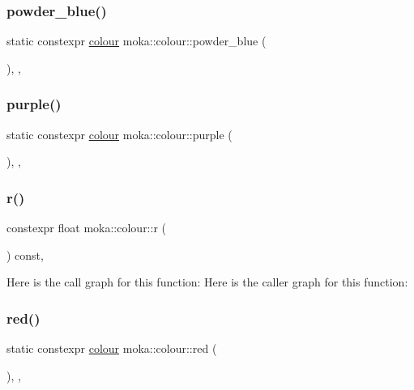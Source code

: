 \subsubsection{\texorpdfstring{powder\_blue()}{powder\_blue()}}
{\footnotesize\ttfamily static constexpr \mbox{\hyperlink{classmoka_1_1colour}{colour}} moka\+::colour\+::powder\+\_\+blue (\begin{DoxyParamCaption}{ }\end{DoxyParamCaption})\hspace{0.3cm}{\ttfamily [inline]}, {\ttfamily [static]}, {\ttfamily [noexcept]}}

\mbox{\label{classmoka_1_1colour_af0e9e47e97a2b81d006c11077715786b}} 
\subsubsection{\texorpdfstring{purple()}{purple()}}
{\footnotesize\ttfamily static constexpr \mbox{\hyperlink{classmoka_1_1colour}{colour}} moka\+::colour\+::purple (\begin{DoxyParamCaption}{ }\end{DoxyParamCaption})\hspace{0.3cm}{\ttfamily [inline]}, {\ttfamily [static]}, {\ttfamily [noexcept]}}

\mbox{\label{classmoka_1_1colour_a2ec71fd89ba133142c84c3a7a0ce35eb}} 
\subsubsection{\texorpdfstring{r()}{r()}}
{\footnotesize\ttfamily constexpr float moka\+::colour\+::r (\begin{DoxyParamCaption}{ }\end{DoxyParamCaption}) const\hspace{0.3cm}{\ttfamily [inline]}, {\ttfamily [noexcept]}}

Here is the call graph for this function\+:
Here is the caller graph for this function\+:
\mbox{\label{classmoka_1_1colour_afda874e3c56a02d95685b4f11515a130}} 
\subsubsection{\texorpdfstring{red()}{red()}}
{\footnotesize\ttfamily static constexpr \mbox{\hyperlink{classmoka_1_1colour}{colour}} moka\+::colour\+::red (\begin{DoxyParamCaption}{ }\end{DoxyParamCaption})\hspace{0.3cm}{\ttfamily [inline]}, {\ttfamily [static]}, {\ttfamily [noexcept]}}

